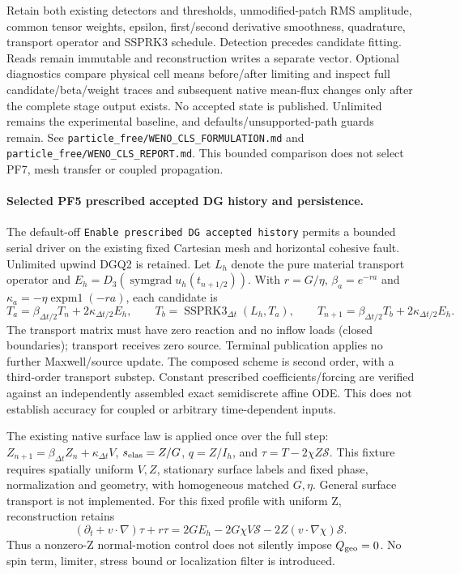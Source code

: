 \documentclass[11pt]{article}
\begin{document}
Retain both existing detectors and thresholds, unmodified-patch RMS amplitude,
common tensor weights, epsilon, first/second derivative smoothness, quadrature,
transport operator and SSPRK3 schedule. Detection precedes candidate fitting.
Reads remain immutable and reconstruction writes a separate vector. Optional
diagnostics compare physical cell means before/after limiting and inspect full
candidate/beta/weight traces and subsequent native mean-flux changes only after
the complete stage output exists. No accepted state is published. Unlimited
remains the experimental baseline, and defaults/unsupported-path guards remain.
See \texttt{particle\_free/WENO\_CLS\_FORMULATION.md} and
\texttt{particle\_free/WENO\_CLS\_REPORT.md}. This bounded comparison does not
select PF7, mesh transfer or coupled propagation.

\paragraph{Selected PF5 prescribed accepted DG history and persistence.}
The default-off \texttt{Enable prescribed DG accepted history} permits a bounded
serial driver on the existing fixed Cartesian mesh and horizontal cohesive fault.
Unlimited upwind DGQ2 is retained. Let $L_h$ denote the pure material transport
operator and $E_h=D_3(\operatorname{symgrad}u_h(t_{n+1/2}))$. With
$r=G/\eta$, $\beta_a=e^{-ra}$ and $\kappa_a=-\eta\operatorname{expm1}(-ra)$,
each candidate is
\[
 T_a=\beta_{\Delta t/2}T_n+2\kappa_{\Delta t/2}E_h,\qquad
 T_b=\operatorname{SSPRK3}_{\Delta t}(L_h,T_a),\qquad
 T_{n+1}=\beta_{\Delta t/2}T_b+2\kappa_{\Delta t/2}E_h.
\]
The transport matrix must have zero reaction and no inflow loads (closed
boundaries); transport receives zero source. Terminal publication applies no
further Maxwell/source update. The composed scheme is second order, with a
third-order transport substep. Constant prescribed coefficients/forcing are
verified against an independently assembled exact semidiscrete affine ODE.
This does not establish accuracy for coupled or arbitrary time-dependent inputs.

The existing native surface law is applied once over the full step:
$Z_{n+1}=\beta_{\Delta t}Z_n+\kappa_{\Delta t}V$,
$s_{\rm elas}=Z/G$, $q=Z/I_h$, and $\tau=T-2\chi Z\mathcal S$.
This fixture requires spatially uniform $V,Z$, stationary surface labels and
fixed phase, normalization and geometry, with homogeneous matched $G,\eta$.
General surface transport is not implemented. For this fixed profile with
uniform Z, reconstruction retains
\[
 (\partial_t+v\cdot\nabla)\tau+r\tau
 =2G E_h-2G\chi V\mathcal S-2Z(v\cdot\nabla\chi)\mathcal S.
\]
Thus a nonzero-Z normal-motion control does not silently impose $Q_{\rm geo}=0$.
No spin term, limiter, stress bound or localization filter is introduced.
\end{document}

